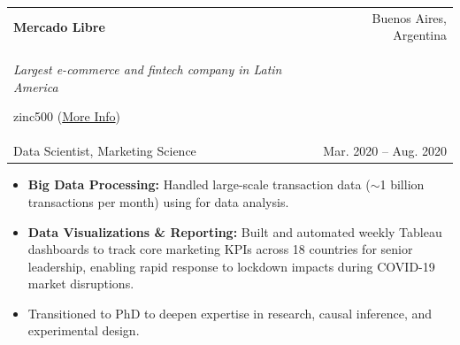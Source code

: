 \documentclass[letterpaper,11pt]{article}
\makeatletter
\newcommand{\link}[2]{{\color{NavyBlue}\href{#1}{#2}}}
\newcommand{\highlightstyle}{\relax} %
\newcommand{\hl}[1]{\highlightstyle{#1}}
\newcommand{\citecolor}[1]{%
  {\footnotesize\begin{color}{zinc500}%
    #1%
  \end{color}}%
}
\newcommand{\resumeItem}[1]{
  \item\small{
    {#1 \vspace{-2pt}}
  }
}
\newcommand{\resumeSubheading}[4]{
  \vspace{0pt}\item
    \begin{tabular*}{0.97\textwidth}[t]{l@{\extracolsep{\fill}}r}
      \textbf{#1} & #2 \\
      \small#3 & \small#4 \\
    \end{tabular*}\vspace{-5pt}
}
\newcommand{\resumeSubSubheading}[2]{
    \item
    \begin{tabular*}{0.97\textwidth}{l@{\extracolsep{\fill}}r}
      \textit{\small#1} & \textit{\small #2} \\
    \end{tabular*}\vspace{-7pt}
}
\newcommand{\resumeSubHeadingListEnd}{\end{itemize}}
\newcommand{\resumeItemListStart}{\begin{itemize}}
\newcommand{\resumeItemListEnd}{\end{itemize}\vspace{-5pt}}
\makeatother
\begin{document}
    \resumeSubheading
      {Mercado Libre}{Buenos Aires, Argentina}
      {\textit{\mdseries Largest e-commerce and fintech company in Latin America} \citecolor{(\link{https://investor.mercadolibre.com/sites/mercadolibre/files/mercadolibre/homepage/meli-2024-investment-story.pdf}{More Info})}\\ Data Scientist, Marketing Science  \todo{review}
      }{Mar. 2020 -- Aug. 2020}
      \resumeItemListStart
      \resumeItem{\textbf{Big Data Processing:} Handled large-scale transaction data ($\sim$1 billion transactions per month) using \hl{SQL} for data analysis.}
      \resumeItem{\textbf{Data Visualizations \& Reporting:} Built and automated weekly Tableau dashboards to track core marketing KPIs across 18 countries for senior leadership, enabling rapid response to lockdown impacts during COVID-19 market disruptions.}
        \resumeItem{Transitioned to PhD to deepen expertise in research, causal inference, and experimental design.}
      \resumeItemListEnd
      
\end{document}
